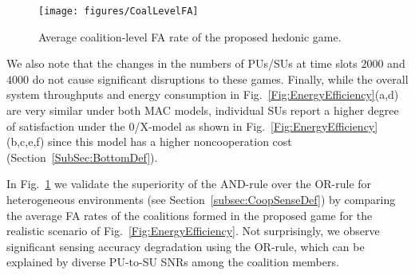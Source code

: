 \documentclass[journal,draftclsnofoot,onecolumn]{IEEEtran}
\theoremstyle{definition}
\newif\ifdoublecolumn
\def\FigScale{0.6}
\def\FigScale{0.65}
\begin{document}
\begin{figure}[!t]
    \centering
    \texttt{[image: figures/CoalLevelFA]}
    \caption{ Average coalition-level FA rate of the proposed hedonic game.}
    \label{Fig:CoalLevelFA}
\end{figure}

We also note that the changes in the numbers of PUs/SUs at time slots $2000$ and $4000$ do not cause significant disruptions to these games. Finally, while the overall system throughputs and energy consumption in Fig.~\ref{Fig:EnergyEfficiency}(a,d) are very similar under both MAC models, individual SUs report a higher degree of satisfaction under the 0/X-model as shown in Fig.~\ref{Fig:EnergyEfficiency}(b,c,e,f) since this model has a higher noncooperation cost (Section~\ref{SubSec:BottomDef}).


\ifdoublecolumn
\begin{figure*}
\normalsize
\begin{align}
U_\mathrm{1/X}^n(\eta ;\rho^n ) &=\beta ^n(1 - P_\mathrm{FA}^n(\eta ))\cdot\smashoperator[l]{\sum\limits_{\mathbf{\tilde{x}}  \in \{0,1\}^{|\rho^n | - 3}}}\Bigg\{{\sum_{(x_1,x_2)\in\{0,1\}^2}}\frac{|\eta|\Pr(X_{\xi_1}=x_1)\Pr(X_{\xi_2}=x_2)\prod _{i=1}^{|\rho^n|-3}\Pr(X_{\xi_{i+2}}=\tilde{x}_i)}{|\eta|+J_{\{\xi_1,\xi_2\}}((x_1,x_2))+J_{\rho^n\backslash\{\eta\}\backslash\{\xi_1\}\backslash\{\xi_2\}}(\mathbf{\tilde{x}})}\Bigg\}\label{Eq:NegExternalityBefore}\\
{U_\mathrm{1/X}^n(\eta ;\tilde \rho^n )} &=\beta ^n(1 - P_\mathrm{FA}^n(\eta ))\cdot\smashoperator[l]{\sum\limits_{\mathbf{\tilde{x}}  \in \{0,1\}^{|\rho^n | - 3}}}\Bigg\{{\sum_{x_1\in\{0,1\}}}\frac{|\eta|\Pr(X_{\xi_1\cup\xi_2}=x_1)\prod _{i=1}^{|\rho^n|-3}\Pr(X_{\xi_{i+2}}=\tilde{x}_i)}{|\eta|+J_{\{\xi_1\cup\xi_2\}}((x_1))+J_{\tilde\rho^n\backslash\{\eta\}\backslash\{\xi_1\cup\xi_2\} }(\mathbf{\tilde x})}\Bigg\}\label{Eq:NegExternalityAfter}\\
 U_\mathrm{1/X}^n(\eta ;\rho^n )&-U_\mathrm{1/X}^n(\eta ; \tilde\rho^n )=\beta ^n(1 - P_{{\mathrm{FA}}}^n(\eta ))\cdot\smashoperator[l]{\sum\limits_{\mathbf{\tilde{x}}  \in \{0,1\}^{|\rho^n | - 3}}} {\Bigg\{ \prod _{i=1}^{|\rho^n|-3}\Pr(X_{\xi_{i+2}}=\tilde{x}_i)\cdot A(\mathbf{\tilde{x}})  \Bigg\}} \label{Eq:NegExternalityProof}
\end{align}
\hrulefill
\vspace*{-10.2pt}
\label{Fig:Eq:NegExternalityBeforeAfter}
\end{figure*}
\fi

In Fig.~\ref{Fig:CoalLevelFA} we validate the superiority of the AND-rule over the OR-rule for heterogeneous environments (see Section~\ref{subsec:CoopSenseDef}) by comparing the average FA rates of the coalitions formed in the proposed game for the realistic scenario of Fig.~\ref{Fig:EnergyEfficiency}. Not surprisingly, we observe significant sensing accuracy degradation using the OR-rule, which can be explained by diverse PU-to-SU SNRs among the coalition members.
\end{document}
